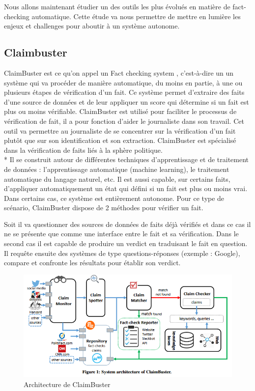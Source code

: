 Nous allons maintenant étudier un des outils les plus évolués en matière de fact-checking automatique. Cette étude va nous permettre de mettre en lumière les enjeux et challenges pour aboutir à un système autonome.

\subsection{Claimbuster} 

ClaimBuster est ce qu'on appel un Fact checking system \cite{hassan2015quest}, c'est-à-dire un un système qui va procéder de manière automatique, du moins en partie, à une ou plusieurs étapes de vérification d'un fait. Ce système permet d'extraire des faits d'une source de données et de leur appliquer un score qui détermine si un fait est plus ou moins vérifiable. ClaimBuster est utilisé pour faciliter le processus de vérification de fait, il a pour fonction d'aider le journaliste dans son travail. Cet outil va permettre au journaliste de se concentrer sur la vérification d'un fait plutôt que sur son identification et son extraction. ClaimBuster est spécialisé dans la vérification de faits liés à la sphère politique.
\\*
Il se construit autour de différentes techniques d'apprentissage et de traitement de données : l'apprentissage automatique (machine learning), le traitement automatique du langage naturel, etc. \cite{hassan2017claimbuster}
Il est aussi capable, sur certains faits, d'appliquer automatiquement un état qui défini si un fait est plus ou moins vrai. Dans certains cas, ce système est entièrement autonome. Pour ce type de scénario, ClaimBuster dispose de 2 méthodes pour vérifier un fait. 

Soit il va questionner des sources de données de faits déjà vérifiés et dans ce cas il ne se présente que comme une interface entre le fait et sa vérification. Dans le second cas il est capable de produire un verdict en traduisant le fait en question. Il requête ensuite des systèmes de type questions-réponses (exemple : Google), compare et confronte les résultats pour établir son verdict.

\begin{figure}[ht]
\centering
\includegraphics[width=\textwidth, draft=false]{imgs/claimbuster.PNG}
\caption{Architecture de ClaimBuster}
\label{claimbuster}
\end{figure}

